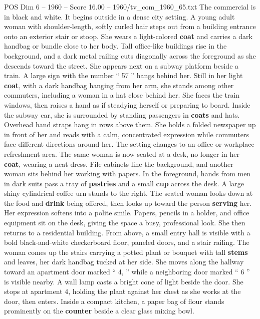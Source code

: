 \begin{textsample}{POS Dim 6 – 1960 – Score 16.00 – 1960/tv\_com\_1960\_65.txt}  \label{ex:f6_pos_022}
The commercial is in black and white.
It begins outside in a dense city setting.
A young adult woman with shoulder-length, softly curled hair steps out from a building entrance onto an exterior stair or stoop.
She wears a light-colored \textbf{coat} and carries a dark handbag or bundle close to her body.
Tall office-like buildings rise in the background, and a dark metal railing cuts diagonally across the foreground as she descends toward the street.
She appears next on a subway platform beside a train.
A large sign with the number “ 57 ” hangs behind her.
Still in her light \textbf{coat}, with a dark handbag hanging from her arm, she stands among other commuters, including a woman in a hat close behind her.
She faces the train windows, then raises a hand as if steadying herself or preparing to board.
Inside the subway car, she is surrounded by standing passengers in \textbf{coats} and hats.
Overhead hand straps hang in rows above them.
She holds a folded newspaper up in front of her and reads with a calm, concentrated expression while commuters face different directions around her.
The setting changes to an office or workplace refreshment area.
The same woman is now seated at a desk, no longer in her \textbf{coat}, wearing a neat dress.
File cabinets line the background, and another woman sits behind her working with papers.
In the foreground, hands from men in dark suits pass a tray of \textbf{pastries} and a small \textbf{cup} across the desk.
A large shiny cylindrical coffee urn stands to the right.
The seated woman looks down at the food and \textbf{drink} being offered, then looks up toward the person \textbf{serving} her.
Her expression softens into a polite smile.
Papers, pencils in a holder, and office equipment sit on the desk, giving the space a busy, professional look.
She then returns to a residential building.
From above, a small entry hall is visible with a bold black-and-white checkerboard floor, paneled doors, and a stair railing.
The woman comes up the stairs carrying a potted plant or bouquet with tall \textbf{stems} and leaves, her dark handbag tucked at her side.
She moves along the hallway toward an apartment door marked “ 4, ” while a neighboring door marked “ 6 ” is visible nearby.
A wall lamp casts a bright cone of light beside the door.
She stops at apartment 4, holding the plant against her chest as she works at the door, then enters.
Inside a compact kitchen, a paper bag of flour stands prominently on the \textbf{counter} beside a clear glass mixing bowl.

\end{textsample}
